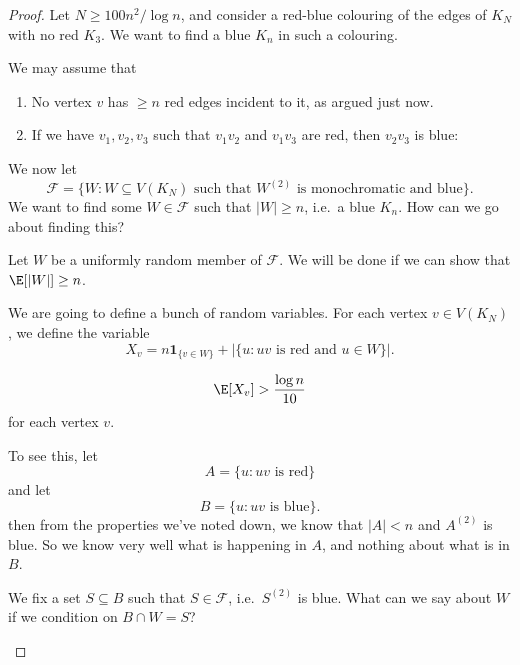 \documentclass[a4paper]{article}
\begin{document}
\begin{proof}
  Let $N \geq 100n^2/\log n$, and consider a red-blue colouring of the edges of $K_N$ with no red $K_3$. We want to find a blue $K_n$ in such a colouring.

  We may assume that
  \begin{enumerate}
    \item No vertex $v$ has $ \geq n$ red edges incident to it, as argued just now.
    \item If we have $v_1, v_2, v_3$ such that $v_1v_2$ and $v_1 v_3$ are red, then $v_2 v_3$ is blue:
      \begin{center}
      \end{center}
  \end{enumerate}
  We now let
  \[
    \mathcal{F} = \{W : W \subseteq V(K_N)\text{ such that }W^{(2)} \text{ is monochromatic and blue}\}.
  \]
  We want to find some $W \in \mathcal{F}$ such that $|W| \geq n$, i.e.\ a blue $K_n$. How can we go about finding this?

  Let $W$ be a uniformly random member of $\mathcal{F}$. We will be done if we can show that $\E[|W|] \geq n$.

  We are going to define a bunch of random variables. For each vertex $v \in V(K_N)$, we define the variable
  \[
    X_v = n \mathbf{1}_{\{v \in W\}} + |\{u: uv\text{ is red and }u \in W\}|.
  \]
  \begin{claim}
   \[
    \E[X_v] > \frac{\log n}{10}
  \]
  for each vertex $v$.
  \end{claim}
  To see this, let
  \[
    A = \{u: uv \text{ is red}\}
  \]
  and let
  \[
    B = \{u: uv \text{ is blue}\}.
  \]
  then from the properties we've noted down, we know that $|A| < n$ and $A^{(2)}$ is blue. So we know very well what is happening in $A$, and nothing about what is in $B$.

  We fix a set $S \subseteq B$ such that $S \in \mathcal{F}$, i.e.\ $S^{(2)}$ is blue. What can we say about $W$ if we condition on $B \cap W = S$?
  \begin{center}
\end{center}
\end{proof}
\end{document}
